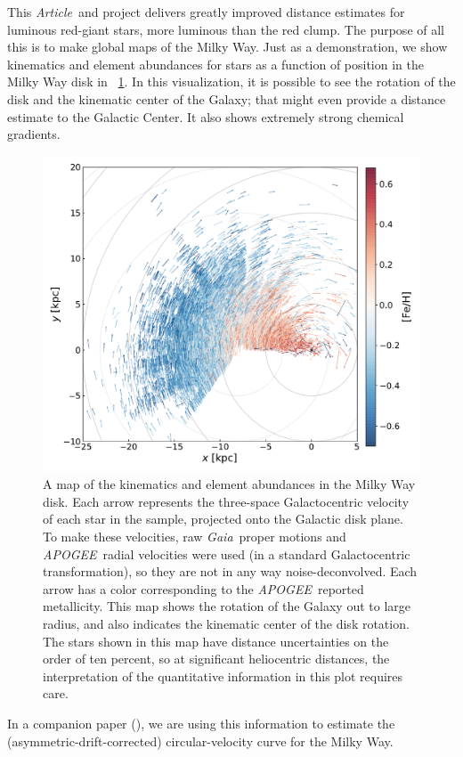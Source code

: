 \documentclass[modern]{aastex62}
\newcommand{\documentname}{\textsl{Article}}
\newcommand{\acronym}[1]{{\small{#1}}}
\newcommand{\project}[1]{\textsl{#1}}
\newcommand{\apogee}{\project{\acronym{APOGEE}}}
\newcommand{\gaia}{\project{Gaia}}
\begin{document}
This \documentname\ and project delivers greatly improved distance estimates for
luminous red-giant stars, more luminous than the red clump.
The purpose of all this is to make global maps of the Milky Way.
Just as a demonstration, we show kinematics and element abundances for stars as a function
of position in the Milky Way disk in \figurename~\ref{fig:disk}.
In this visualization, it is possible to see the rotation of the disk and the
kinematic center of the Galaxy; that might even provide a distance estimate to the Galactic
Center.
It also shows extremely strong chemical gradients.
\begin{figure}
\includegraphics[width=\textwidth]{map.pdf}
\caption{A map of the kinematics and element abundances in the Milky Way disk.
  Each arrow represents the three-space Galactocentric velocity of each star
  in the sample, projected onto the Galactic disk plane.
  To make these velocities, raw \gaia\ proper motions and \apogee\ radial velocities
  were used (in a standard Galactocentric transformation), so they are
  not in any way noise-deconvolved.
  Each arrow has a color corresponding to the \apogee\ reported metallicity.
  This map shows the rotation of the Galaxy out to large radius, and also
  indicates the kinematic center of the disk rotation. The stars shown in this
  map have distance uncertainties on the order of ten percent, so at significant
  heliocentric distances, the interpretation of
  the quantitative information in this plot requires care.\label{fig:disk}}
\end{figure}
In a companion paper (\citealt{eilers}), we are using this information to estimate
the (asymmetric-drift-corrected) circular-velocity curve for the Milky Way.
\end{document}
